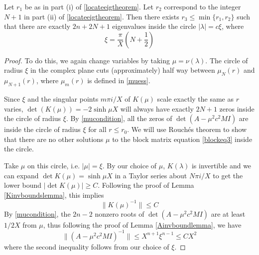 \documentclass[thesis.tex]{subfiles}
\begin{document}
\begin{lemma}\label{eigcount}
Let $r_1$ be as in part (i) of \cref{locateeigtheorem}. Let $r_2$ correspond to the integer $N+1$ in part (ii) of \cref{locateeigtheorem}. Then there exists $r_3 \leq \min\{r_1, r_2\}$ such that there are exactly $2n + 2 N + 1$ eigenvalues inside the circle $|\lambda| = c \xi$, where
\[
\xi = \frac{\pi}{X}\left( N + \frac{1}{2} \right)
\]

\begin{proof}
To do this, we again change variables by taking $\mu = \nu(\lambda)$. The circle of radius $\xi$ in the complex plane cuts (approximately) half way between $\mu_N(r)$ and $\mu_{N+1}(r)$, where $\mu_m(r)$ is defined in \cref{muess}. 

Since $\xi$ and the singular points $m \pi i/X$ of $K(\mu)$ scale exactly the same as $r$ varies, $\det(K(\mu)) = -2 \sinh \mu X$ will always have exactly $2N + 1$ zeros inside the circle of radius $\xi$. By \cref{mucondition}, all the zeros of $\det(A - \mu^2 c^2 M I)$ are inside the circle of radius $\xi$ for all $r \leq r_0$. We will use Rouch\'es theorem to show that there are no other solutions $\mu$ to the block matrix equation \cref{blockeq3} inside the circle.

Take $\mu$ on this circle, i.e. $|\mu| = \xi$. By our choice of $\mu$, $K(\lambda)$ is invertible and we can expand $\det K(\mu) = \sinh \mu X$ in a Taylor series about $N \pi i/X$ to get the lower bound $|\det K(\mu)| \geq C$. Following the proof of Lemma \ref{Kinvboundslemma}, this implies
\begin{equation}\label{Kinvboundxi}
\|K(\mu)^{-1}\| \leq C
\end{equation}
By \cref{mucondition}, the $2n-2$ nonzero roots of $\det(A - \mu^2 c^2 M I)$ are at least $1/2X$ from $\mu$, thus following the proof of Lemma \ref{Ainvboundlemma}, we have
\begin{equation}\label{Ainvboundxi}
\|(A - \mu^2 c^2 M I)^{-1}\| \leq X^{n+1} \xi^{n-1} \leq C X^2
\end{equation}
where the second inequality follows from our choice of $\xi$. 


\end{proof}
\end{lemma}
\end{document}
